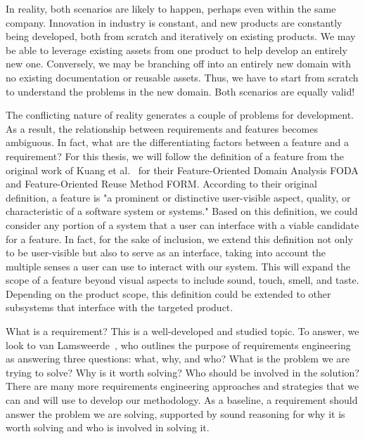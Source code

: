In reality, both scenarios are likely to happen, perhaps even within the same company. Innovation in industry is constant, and new products are constantly being developed, both from scratch and iteratively on existing products. We may be able to leverage existing assets from one product to help develop an entirely new one. Conversely, we may be branching off into an entirely new domain with no existing documentation or reusable assets. Thus, we have to start from scratch to understand the problems in the new domain. Both scenarios are equally valid!

The conflicting nature of reality generates a couple of problems for development. As a result, the relationship between requirements and features becomes ambiguous. In fact, what are the differentiating factors between a feature and a requirement? For this thesis, we will follow the definition of a feature from the original work of Kuang et al.~\cite{kang1990feature, kang1998form} for their Feature-Oriented Domain Analysis \gls{FODA} and Feature-Oriented Reuse Method \gls{FORM}. According to their original definition, a feature is "a prominent or distinctive user-visible aspect, quality, or characteristic of a software system or systems." Based on this definition, we could consider any portion of a system that a user can interface with a viable candidate for a feature. In fact, for the sake of inclusion, we extend this definition not only to be user-visible but also to serve as an interface, taking into account the multiple senses a user can use to interact with our system. This will expand the scope of a feature beyond visual aspects to include sound, touch, smell, and taste. Depending on the product scope, this definition could be extended to other subsystems that interface with the targeted product.

What is a requirement? This is a well-developed and studied topic. To answer, we look to van Lamsweerde~\cite{lamsweerde2009requirements}, who outlines the purpose of requirements engineering as answering three questions: what, why, and who? What is the problem we are trying to solve? Why is it worth solving? Who should be involved in the solution? There are many more requirements engineering approaches and strategies that we can and will use to develop our methodology. As a baseline, a requirement should answer the problem we are solving, supported by sound reasoning for why it is worth solving and who is involved in solving it. 


